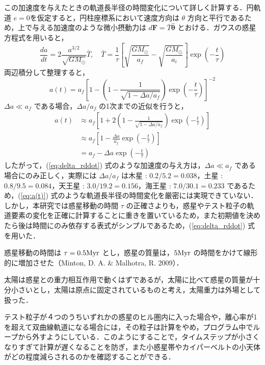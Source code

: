 \documentclass[11pt,a4paper,oneside,onecolumn]{jreport}
\begin{document}
この加速度を与えたときの軌道長半径の時間変化について詳しく計算する．円軌道 $e = 0$を仮定すると，円柱座標系において速度方向は $\theta$ 方向と平行であるため，上で与える加速度のような微小摂動力は $d {\bm F} = \bar{T} \hat{\bm \theta}$ とおける．ガウスの惑星方程式を用いると，
\begin{equation}
\frac{d a}{d t} = 2 \frac{a^{3/2}}{\sqrt{G M_{\odot}}} \bar{T}, \quad \bar{T} = \frac{1}{\tau} \left[ \sqrt{\frac{G M_{\odot}}{a_f}} - \sqrt{\frac{G M_{\odot}}{a_i}} \right] \exp \left(- \frac{t}{\tau} \right)
\end{equation}
両辺積分して整理すると，
\begin{equation}
a (t) = a_f \left[ 1 - \left( 1 - \frac{1}{\sqrt{1 - \Delta a/ a_f}} \right) \exp \left( - \frac{t}{\tau} \right) \right]^{-2} \label{eq:a(t)_new}
\end{equation}
$\Delta a \ll a_f$ である場合，$\Delta a/ a_f$ の1次までの近似を行うと，
\begin{equation}
\begin{split}
a (t) & \approx a_f \left[ 1 + 2 \left( 1 - \frac{1}{\sqrt{1 - \Delta a/ a_f}} \right) \exp \left( - \frac{t}{\tau} \right) \right] \\
& \approx a_f \left[ 1 - \frac{\Delta a}{a_f} \exp \left( - \frac{t}{\tau} \right) \right] \\
& = a_f - \Delta a \exp \left( - \frac{t}{\tau} \right)
\end{split}
\label{eq:a(t)_approx}
\end{equation}
したがって，(\ref{eq:delta_rddot}) 式のような加速度の与え方は，$\Delta a \ll a_f$ である場合にのみ正しく，実際には $\Delta a/ a_f$ は木星 : $0.2 / 5.2 = 0.038$，土星 : $0.8 / 9.5 = 0.084$，天王星 : $3.0 /19.2 = 0.156$，海王星 : $7.0 / 30.1 = 0.233$ であるため，(\ref{eq:a(t)}) 式のような軌道長半径の時間変化を厳密には実現できていない．しかし，本研究では惑星移動の時間 $\tau$ の正確さよりも，惑星やテスト粒子の軌道要素の変化を正確に計算することに重きを置いているため，また初期値を決めたら後は時間にのみ依存する表式がシンプルであるため，(\ref{eq:delta_rddot}) 式を用いた．

惑星移動の時間は $\tau = 0.5 {\rm Myr}$ とし，惑星の質量は，$5 {\rm Myr}$ の時間をかけて線形的に増加させた（Minton, D. A. \& Malhotra, R. 2009）．

太陽は惑星との重力相互作用で動くはずであるが，太陽に比べて惑星の質量が十分小さいとし，太陽は原点に固定されているものと考え，太陽重力は外場として扱った．

テスト粒子が４つのうちいずれかの惑星のヒル圏内に入った場合や，離心率が1を超えて双曲線軌道になる場合には，その粒子は計算をやめ，プログラム中でループから外すようにしている．このようにすることで，タイムステップが小さくなりすぎて計算が遅くなることを防ぎ，また小惑星帯やカイパーベルトの小天体がどの程度減らされるのかを確認することができる．
\end{document}
